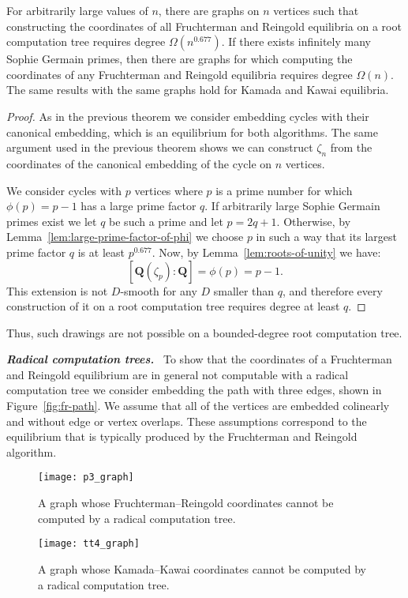 \documentclass[oribibl,10pt]{llncs}
\newcommand{\rationals}{\mathbf{Q}}
\newcommand{\Emph}[1]{\smallskip\textbf{\textit{#1}}~}
\begin{document}
\begin{theorem}\label{thm:force-root}
For arbitrarily large values of $n$, there are graphs on $n$ vertices such that constructing the coordinates of all Fruchterman and Reingold equilibria on a root computation tree requires degree $\Omega(n^{0.677})$. If there exists infinitely many Sophie Germain primes, then there are graphs for which computing the coordinates of any Fruchterman and Reingold equilibria requires degree $\Omega(n)$. The same results with the same graphs hold for Kamada and Kawai equilibria.
\end{theorem}
\begin{proof}
As in the previous theorem we consider embedding cycles with their canonical embedding, which is an equilibrium for both algorithms. The same argument used in the previous theorem shows we can construct $\zeta_n$ from the coordinates of the canonical embedding of the cycle on $n$ vertices.

We consider cycles with $p$ vertices where $p$ is a prime number for which $\phi(p) = p - 1$ has a large prime factor $q$. If arbitrarily large Sophie Germain primes exist we let $q$ be such a prime and let $p=2q+1$. Otherwise, by Lemma~\ref{lem:large-prime-factor-of-phi} we choose $p$ in such a way that its largest prime factor $q$ is at least $p^{0.677}$. Now, by Lemma~\ref{lem:roots-of-unity} we have:
\[
[\rationals(\zeta_p) : \rationals] = \phi(p) = p - 1.
\]
This extension is not $D$-smooth for any $D$ smaller than $q$, and therefore every construction of it on a root computation tree requires degree at least $q$.
\end{proof}

Thus, such drawings are not possible on a bounded-degree root computation tree.

\Emph{Radical computation trees.}
To show that the coordinates of a Fruchterman and Reingold equilibrium are in general not computable with a radical computation tree we consider embedding the path with three edges, shown in Figure~\ref{fig:fr-path}. 
We assume that all of the vertices are embedded colinearly and without edge or vertex overlaps. These assumptions correspond to the equilibrium that is typically produced by the Fruchterman and Reingold algorithm.


\begin{figure}[tb]
\begin{minipage}[t]{0.4\textwidth} 
\centering
\texttt{[image: p3\_graph]}
\caption{A graph whose Fruchterman--Reingold coordinates cannot be computed by a radical computation tree.}
\label{fig:fr-path}
\end{minipage}\hfill
\begin{minipage}[t]{0.4\textwidth} 
\centering
\texttt{[image: tt4\_graph]}
\caption{A graph whose Kamada--Kawai coordinates cannot be computed by a radical computation tree.}
\label{fig:kk-radical}
\end{minipage}
\end{figure}
\end{document}
